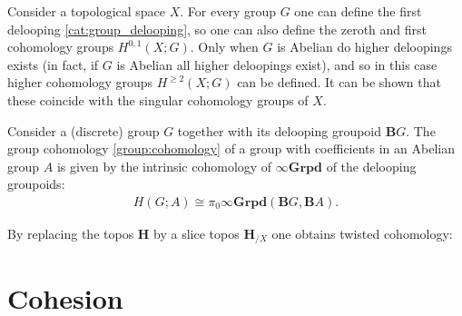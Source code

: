     \begin{example}
        Consider a topological space $X$. For every group $G$ one can define the first delooping \ref{cat:group_delooping}, so one can also define the zeroth and first cohomology groups $H^{0,1}(X;G)$. Only when $G$ is Abelian do higher deloopings exists (in fact, if $G$ is Abelian all higher deloopings exist), and so in this case higher cohomology groups $H^{\geq 2}(X;G)$ can be defined. It can be shown that these coincide with the singular cohomology groups of $X$.
    \end{example}
    \begin{example}
        Consider a (discrete) group $G$ together with its delooping groupoid $\mathbf{B}G$. The group cohomology \ref{group:cohomology} of a group with coefficients in an Abelian group $A$ is given by the intrinsic cohomology of $\infty\mathbf{Grpd}$ of the delooping groupoids:
        \begin{gather}
            H(G;A)\cong\pi_0\infty\mathbf{Grpd}(\mathbf{B}G,\mathbf{B}A).
        \end{gather}
    \end{example}

    By replacing the topos $\mathbf{H}$ by a slice topos $\mathbf{H}_{/X}$ one obtains twisted cohomology:

\section{Cohesion}

